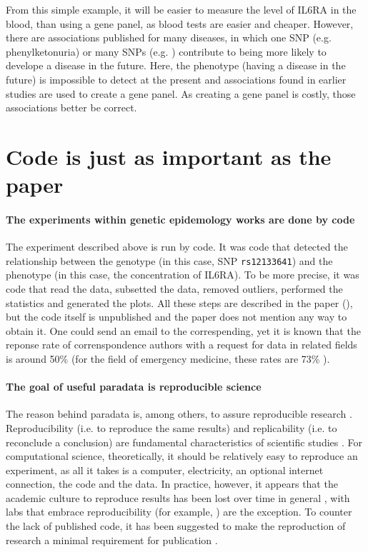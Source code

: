 From this simple example, it will be easier
to measure the level of IL6RA in the blood, than using a gene panel,
as blood tests are easier and cheaper.
However, there are associations published for many diseases,
in which one SNP (e.g. phenylketonuria) or many SNPs (e.g. \cite{bruce2009metabolic}) 
contribute to being more likely to develope a disease in the future. 
Here, the phenotype (having a disease in the future) 
is impossible to detect at the present
and associations found in earlier studies are used to create a gene panel.
As creating a gene panel is costly, those associations better be correct.

\section{Code is just as important as the paper}

\paragraph{The experiments within genetic epidemology works are done by code}

The experiment described above is run by code. 
It was code that detected the relationship between the genotype
(in this case, SNP \verb|rs12133641|) 
and the phenotype (in this case, the concentration of IL6RA).
To be more precise, it was code that read the data,
subsetted the data, removed outliers, 
performed the statistics and generated the plots.
All these steps are described in the paper (\cite{ahsan2017relative}), 
but the code itself is unpublished
and the paper does not mention any way to obtain it.
One could send an email to the correspending,
yet it is known that the reponse rate of correnspondence authors 
with a request for data in related fields is around 50\% 
\cite{manca2018non, teunis2015corresponding} 
(for the field of emergency medicine, these rates are 73\% \cite{o2003email}).

\paragraph{The goal of useful paradata is reproducible science}

The reason behind paradata is, among others,
to assure reproducible research \cite{huvila2022improving}.
Reproducibility (i.e. to reproduce the same results) 
and replicability (i.e. to reconclude a conclusion)
are fundamental characteristics of scientific studies \cite{patil2019visual}.
For computational science, theoretically, it should be relatively easy to 
reproduce an experiment, as all it takes is a computer, electricity,
an optional internet connection, the code and the data.
In practice, however, it appears that 
the academic culture to reproduce results 
has been lost over time in general \cite{peng2011reproducible},
with labs that embrace reproducibility (for example, \cite{barba2016hard})
are the exception.
To counter the lack of published code, 
it has been suggested to make the reproduction of research 
a minimal requirement for publication \cite{peng2011reproducible}.

